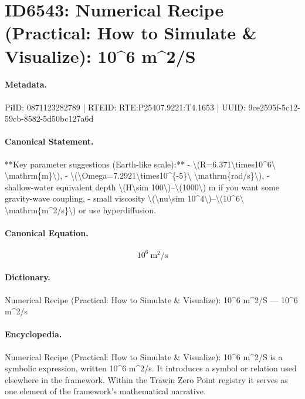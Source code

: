 \section*{ID6543: Numerical Recipe (Practical: How to Simulate \& Visualize): 10\textasciicircum{}6 m\textasciicircum{}2/S}
\paragraph{Metadata.}
PiID: 0871123282789 | RTEID: RTE:P25407.9221:T4.1653 | UUID: 9ce2595f-5c12-59cb-8582-5d50bc127a6d

\paragraph{Canonical Statement.}
**Key parameter suggestions (Earth-like scale):** - \textbackslash{}(R=6.371\textbackslash{}times10\textasciicircum{}6\textbackslash{} \textbackslash{}mathrm\{m\}\textbackslash{}), - \textbackslash{}(\textbackslash{}Omega=7.2921\textbackslash{}times10\textasciicircum{}\{-5\}\textbackslash{} \textbackslash{}mathrm\{rad/s\}\textbackslash{}), - shallow-water equivalent depth \textbackslash{}(H\textbackslash{}sim 100\textbackslash{})–\textbackslash{}(1000\textbackslash{}) m if you want some gravity-wave coupling, - small viscosity \textbackslash{}(\textbackslash{}nu\textbackslash{}sim 10\textasciicircum{}4\textbackslash{})–\textbackslash{}(10\textasciicircum{}6\textbackslash{} \textbackslash{}mathrm\{m\textasciicircum{}2/s\}\textbackslash{}) or use hyperdiffusion.

\paragraph{Canonical Equation.}
\[
10^6\ \mathrm{m^2/s}
\]

\paragraph{Dictionary.}
Numerical Recipe (Practical: How to Simulate \& Visualize): 10\textasciicircum{}6 m\textasciicircum{}2/S — 10\textasciicircum{}6 m\textasciicircum{}2/s

\paragraph{Encyclopedia.}
Numerical Recipe (Practical: How to Simulate \& Visualize): 10\textasciicircum{}6 m\textasciicircum{}2/S is a symbolic expression, written 10\textasciicircum{}6 m\textasciicircum{}2/s. It introduces a symbol or relation used elsewhere in the framework. Within the Trawin Zero Point registry it serves as one element of the framework's mathematical narrative.

